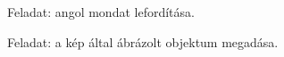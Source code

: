 \documentclass[11pt, a4paper]{article}
\begin{document}
	 \begin{figure}[h!]
	 	\center
	 	\caption{Feladat: angol mondat lefordítása.}
	 	\label{fig:exercise-sentence}
	 \end{figure}
	\begin{figure}[h!]
		\center
		\caption{Feladat: a kép által ábrázolt objektum megadása.}
		\label{fig:exercise-image}
	\end{figure}
\end{document}

